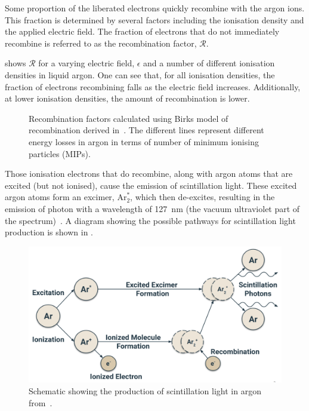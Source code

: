 Some proportion of the liberated electrons quickly recombine with the argon ions.
This fraction is determined by several factors including the ionisation density and the applied electric field.
The fraction of electrons that do not immediately recombine is referred to as the recombination factor, $\mathcal{R}$.

 shows $\mathcal{R}$ for a varying electric field, $\epsilon$ and a number of different ionisation densities in liquid argon.
One can see that, for all ionisation densities, the fraction of electrons recombining falls as the electric field increases.
Additionally, at lower ionisation densities, the amount of recombination is lower.

\begin{figure}[h]
  \begin{adjustbox}{max totalsize={.8\linewidth}, center}
    
  \end{adjustbox}
  \caption[Recombination factors for different electric fields and ionisation densities.]{Recombination factors calculated using Birks model of recombination derived in~\cite{recombArgoneut}. The different lines represent different energy losses in argon in terms of number of minimum ionising particles (MIPs).}
  \label{fig:recombFactors}
\end{figure}

Those ionisation electrons that do recombine, along with argon atoms that are excited (but not ionised), cause the emission of scintillation light.
These excited argon atoms form an excimer, $\text{Ar}^{*}_{2}$, which then de-excites, resulting in the emission of photon with a wavelength of \SI{127}{\nano\metre} (the vacuum ultraviolet part of the spectrum)~\cite{argonScintillation}.
A diagram showing the possible pathways for scintillation light production is shown in .

\begin{figure}[h]
  \centering
  \includegraphics[width=.8\linewidth]{files/figures/dune_detector/scintillationLight}
  \caption[Schematic showing the production of scintillation light in argon.]{Schematic showing the production of scintillation light in argon from~\cite{tdrVol4}.}
  \label{fig:scintillationLight}
\end{figure}

